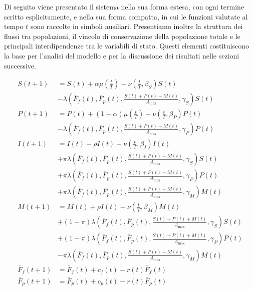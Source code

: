 Di seguito viene presentato il sistema nella sua forma estesa, con ogni termine scritto esplicitamente, e nella sua forma compatta, in cui le funzioni valutate al tempo $t$ sono raccolte in simboli ausiliari. Presentiamo inoltre la struttura dei flussi tra popolazioni, il vincolo di conservazione della popolazione totale e le principali interdipendenze tra le variabili di stato. Questi elementi costituiscono la base per l'analisi del modello e per la discussione dei risultati nelle sezioni successive.

\begin{equation*}
    \begin{aligned}
        S(t+1) &= S(t)
            + \alpha \mu\left(\frac{t}{T}\right)
            - \nu\left(\frac{t}{T}, \beta_S\right) S(t) \\
            &- \lambda\left(\bar{F}_f(t), \bar{F}_p(t), \frac{S(t) + P(t) + M(t)}{A_{\max}}, \gamma_S\right) S(t) \\[10pt]
        P(t+1) &= P(t)
            + (1 - \alpha) \mu\left(\frac{t}{T}\right)
            - \nu\left(\frac{t}{T}, \beta_P\right) P(t) \\
            &- \lambda\left(\bar{F}_f(t), \bar{F}_p(t), \frac{S(t) + P(t) + M(t)}{A_{\max}}, \gamma_P\right) P(t) \\[10pt]
        I(t+1) &= I(t) 
            - \rho I(t)
            - \nu\left(\frac{t}{T}, \beta_I\right) I(t) \\
            &+ \pi \lambda\left(\bar{F}_f(t), \bar{F}_p(t), \frac{S(t) + P(t) + M(t)}{A_{\max}}, \gamma_S\right) S(t) \\
            &+ \pi \lambda\left(\bar{F}_f(t), \bar{F}_p(t), \frac{S(t) + P(t) + M(t)}{A_{\max}}, \gamma_P\right) P(t) \\
            &+ \pi \lambda\left(\bar{F}_f(t), \bar{F}_p(t), \frac{S(t) + P(t) + M(t)}{A_{\max}}, \gamma_M\right) M(t) \\[10pt]
        M(t+1) &= M(t)
            + \rho I(t)
            - \nu\left(\frac{t}{T}, \beta_M\right) M(t) \\
            &+ (1 - \pi) \lambda\left(\bar{F}_f(t), \bar{F}_p(t), \frac{S(t) + P(t) + M(t)}{A_{\max}}, \gamma_S\right) S(t) \\
            &+ (1 - \pi) \lambda\left(\bar{F}_f(t), \bar{F}_p(t), \frac{S(t) + P(t) + M(t)}{A_{\max}}, \gamma_P\right) P(t) \\
            &- \pi \lambda\left(\bar{F}_f(t), \bar{F}_p(t), \frac{S(t) + P(t) + M(t)}{A_{\max}}, \gamma_M\right) M(t) \\[10pt]
        \bar{F}_f(t+1) &= \bar{F}_f(t)
            + c_f(t)
            - r(t) \bar{F}_f(t) \\[10pt]
        \bar{F}_p(t+1) &= \bar{F}_p(t)
            + c_p(t)
            - r(t) \bar{F}_p(t)
    \end{aligned}
\end{equation*}
